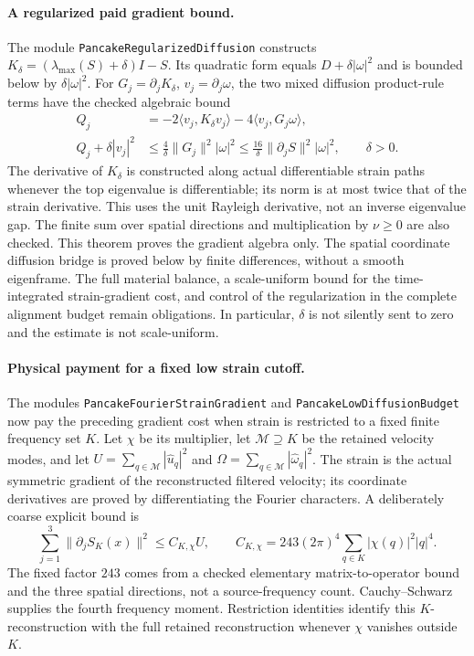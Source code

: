 \documentclass[11pt]{article}
\theoremstyle{definition}
\begin{document}
\paragraph{A regularized paid gradient bound.}
The module \texttt{PancakeRegularizedDiffusion} constructs
$K_\delta=(\lambda_{\max}(S)+\delta)I-S$. Its quadratic form equals
$D+\delta|\omega|^2$ and is bounded below by $\delta|\omega|^2$.
For $G_j=\partial_jK_\delta$, $v_j=\partial_j\omega$, the two mixed
diffusion product-rule terms have the checked algebraic bound
\begin{align*}
 Q_j&=-2\langle v_j,K_\delta v_j\rangle
                -4\langle v_j,G_j\omega\rangle,\\
 Q_j+\delta|v_j|^2
    &\le \frac{4}{\delta}\|G_j\|^2|\omega|^2
     \le \frac{16}{\delta}\|\partial_jS\|^2|\omega|^2,
       \qquad \delta>0.
\end{align*}
The derivative of $K_\delta$ is constructed along actual differentiable
strain paths whenever the top eigenvalue is differentiable; its norm is
at most twice that of the strain derivative. This uses the unit
Rayleigh derivative, not an inverse eigenvalue gap. The finite sum over
spatial directions and multiplication by $\nu\ge0$ are also checked.
This theorem proves the gradient algebra only. The spatial coordinate
diffusion bridge is proved below by finite differences, without a smooth
eigenframe. The full material balance, a scale-uniform bound for the
time-integrated strain-gradient cost, and control of the regularization
in the complete alignment budget remain obligations. In particular,
$\delta$ is not silently sent to zero and the estimate is not scale-uniform.

\paragraph{Physical payment for a fixed low strain cutoff.}
The modules \texttt{PancakeFourierStrainGradient} and
\texttt{PancakeLowDiffusionBudget} now pay the preceding gradient cost
when strain is restricted to a fixed finite frequency set $K$.
Let $\chi$ be its multiplier, let $\mathcal M\supseteq K$ be the retained
velocity modes, and let $U=\sum_{q\in\mathcal M}|\widehat u_q|^2$ and
$\Omega=\sum_{q\in\mathcal M}|\widehat\omega_q|^2$.
The strain is the actual symmetric gradient of the reconstructed
filtered velocity; its coordinate derivatives are proved by
differentiating the Fourier characters. A deliberately coarse explicit
bound is
\[
 \sum_{j=1}^3\|\partial_j S_K(x)\|^2\le C_{K,\chi}U,
 \qquad C_{K,\chi}=243(2\pi)^4
       \sum_{q\in K}|\chi(q)|^2|q|^4.
\]
The fixed factor $243$ comes from a checked elementary matrix-to-operator
bound and the three spatial directions, not a source-frequency count.
Cauchy--Schwarz supplies the fourth frequency moment. Restriction
identities identify this $K$-reconstruction with the full retained
reconstruction whenever $\chi$ vanishes outside $K$.
\end{document}
